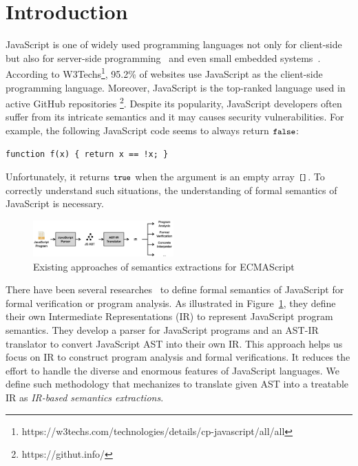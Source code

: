 \section{Introduction}

JavaScript is one of widely used programming languages not only for client-side
but also for server-side programming~\cite{nodejs, meanjs}
and even small embedded systems~\cite{espruino, tessel2}.
According to W3Techs\footnote{https://w3techs.com/technologies/details/cp-javascript/all/all},
95.2\% of websites use JavaScript as the client-side programming language.
Moreover, JavaScript is the top-ranked language used in active GitHub repositories
\footnote{https://githut.info/}.
Despite its popularity, JavaScript developers often suffer from its intricate semantics
and it may causes security vulnerabilities. For example, the following JavaScript
code seems to always return \( \texttt{\small false} \):
\begin{lstlisting}[style=myJSstyle]
function f(x) { return x == !x; }
\end{lstlisting}
Unfortunately, it returns \( \texttt{\small true} \) when the argument is an empty array
\( \texttt{\small[]} \). To correctly understand such situations, the understanding of
formal semantics of JavaScript is necessary.

\begin{figure}
  \centering
  \includegraphics[width=0.48\textwidth]{img/existing.png}
  \caption{Existing approaches of semantics extractions for ECMAScript}
  \label{fig:existing}
\end{figure}

There have been several researches~\cite{lambdajs, kjs, javert} to define formal semantics of JavaScript
for formal verification or program analysis. As illustrated in Figure~\ref{fig:existing},
they define their own Intermediate Representations (IR) to represent JavaScript
program semantics. They develop a parser for JavaScript programs and
an AST-IR translator to convert JavaScript AST into their own IR.
This approach helps us focus on IR to construct program analysis and formal verifications.
It reduces the effort to handle the diverse and enormous features of JavaScript languages.
We define such methodology that mechanizes to translate given AST into a treatable IR
as \textit{IR-based semantics extractions}.

